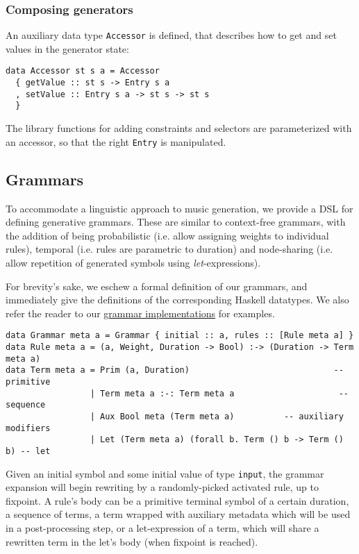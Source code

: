 \documentclass[11pt,a4paper]{article}
\newcommand{\icode}[1]{\texttt{#1}}
\begin{document}
\subsubsection{Composing generators}
An auxiliary data type \icode{Accessor} is defined, that describes how to get and set values in the generator state:
\begin{verbatim}
data Accessor st s a = Accessor
  { getValue :: st s -> Entry s a
  , setValue :: Entry s a -> st s -> st s
  }
\end{verbatim}

The library functions for adding constraints and selectors are parameterized with an accessor, so that the right \icode{Entry} is manipulated.

\subsection{Grammars}
To accommodate a linguistic approach to music generation, we provide a DSL for defining generative grammars. These are similar to context-free grammars, with the addition of being probabilistic (i.e. allow assigning weights to individual rules), temporal (i.e. rules are parametric to duration) and node-sharing (i.e. allow repetition of generated symbols using \textit{let}-expressions).

For brevity's sake, we eschew a formal definition of our grammars, and immediately give the definitions of the corresponding Haskell datatypes. We also refer the reader to our \href{https://github.com/omelkonian/AlgoRhythm/blob/master/AlgoRhythm/src/Grammar}{grammar implementations} for examples.
\begin{verbatim}
data Grammar meta a = Grammar { initial :: a, rules :: [Rule meta a] }
data Rule meta a = (a, Weight, Duration -> Bool) :-> (Duration -> Term meta a)
data Term meta a = Prim (a, Duration)                             -- primitive
                 | Term meta a :-: Term meta a                     -- sequence
                 | Aux Bool meta (Term meta a)          -- auxiliary modifiers
                 | Let (Term meta a) (forall b. Term () b -> Term () b) -- let
\end{verbatim}

Given an initial symbol and some initial value of type \icode{input}, the grammar expansion will begin rewriting by a randomly-picked activated rule, up to fixpoint. A rule's body can be a primitive terminal symbol of a certain duration, a sequence of terms, a term wrapped with auxiliary metadata which will be used in a post-processing step, or a let-expression of a term, which will share a rewritten term in the let's body (when fixpoint is reached).
\end{document}
